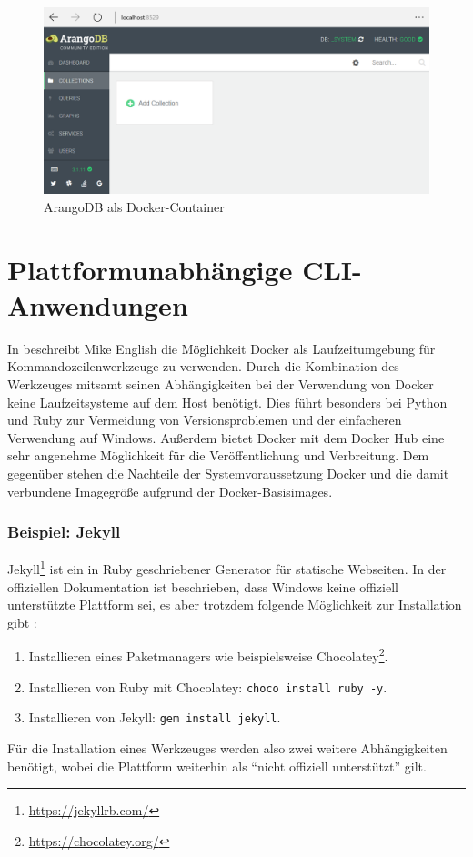 \begin{figure}[htbp]
    \centering
    \includegraphics[width=0.9\linewidth,clip]{images/arangodb-demo}
    \caption{ArangoDB als Docker-Container}
\label{fig:arangodb-demo}
\end{figure}

\section{Plattformunabhängige CLI-Anwendungen}
\label{sec:cross-platform-applications}
In \autocite{docker-cli-tools:online} beschreibt Mike English die Möglichkeit Docker als Laufzeitumgebung für Kommandozeilenwerkzeuge zu verwenden.
Durch die Kombination des Werkzeuges mitsamt seinen Abhängigkeiten bei der Verwendung von Docker keine Laufzeitsysteme auf dem Host benötigt.
Dies führt besonders bei Python und Ruby zur Vermeidung von Versionsproblemen und der einfacheren Verwendung auf Windows.
Außerdem bietet Docker mit dem Docker Hub eine sehr angenehme Möglichkeit für die Veröffentlichung und Verbreitung.
Dem gegenüber stehen die Nachteile der Systemvoraussetzung Docker und die damit verbundene Imagegröße aufgrund der Docker-Basisimages.

\subsubsection{Beispiel: Jekyll}
Jekyll\footnote{\url{https://jekyllrb.com/}} ist ein in Ruby geschriebener Generator für statische Webseiten.
In der offiziellen Dokumentation ist beschrieben, dass Windows keine offiziell unterstützte Plattform sei, es aber trotzdem folgende Möglichkeit zur Installation gibt \autocite{jekyll-windows:online}:
\begin{enumerate}
    \item Installieren eines Paketmanagers wie beispielsweise Chocolatey\footnote{\url{https://chocolatey.org/}}.
    \item Installieren von Ruby mit Chocolatey: \texttt{choco install ruby -y}.
    \item Installieren von Jekyll: \texttt{gem install jekyll}.
\end{enumerate}
Für die Installation eines Werkzeuges werden also zwei weitere Abhängigkeiten benötigt, wobei die Plattform weiterhin als "`nicht offiziell unterstützt"' gilt.

